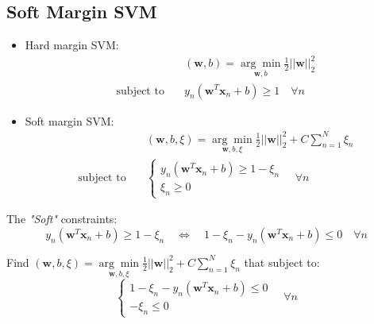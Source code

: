 \subsection{Soft Margin \ac{SVM}}
\begin{itemize}
	\item Hard margin \ac{SVM}:
	\begin{align*}
		&(\textbf{w},b) = \underset{\textbf{w}, b}{\arg\min} \frac{1}{2}||\textbf{w}||^2_2 \\
		\text{subject to}\quad &y_n(\textbf{w}^T\textbf{x}_n+b) \geq 1 \quad \forall n
	\end{align*}
	\item Soft margin \ac{SVM}:
	\begin{align*}
		&(\textbf{w},b, \xi) = \underset{\textbf{w}, b, \xi}{\arg\min} \frac{1}{2} || \textbf{w} ||^2_2 + C \sum_{n=1}^{N} \xi_n \\
		\text{subject to}\quad &\begin{cases}
			y_n(\textbf{w}^T\textbf{x}_n+b) \geq 1 -\xi_n\\
			\xi_n \geq 0
		\end{cases} \quad \forall n 
	\end{align*}
\end{itemize}

The \textit{"Soft"} constraints:
\begin{equation*}
	y_n(\textbf{w}^T\textbf{x}_n+b) \geq 1 -\xi_n \quad \iff \quad 1 - \xi_n -y_n(\textbf{w}^T \textbf{x}_n +b) \leq 0 \quad \forall n
\end{equation*}

 Find $\displaystyle (\textbf{w},b, \xi) = \underset{\textbf{w}, b, \xi}{\arg\min} \frac{1}{2} || \textbf{w} ||^2_2 + C \sum_{n=1}^{N} \xi_n$ that subject to:
\begin{equation*}
	\begin{cases}
		1 - \xi_n -y_n(\textbf{w}^T \textbf{x}_n +b) \leq 0 \\
		- \xi_n \leq 0
	\end{cases} \quad \forall n
\end{equation*}

